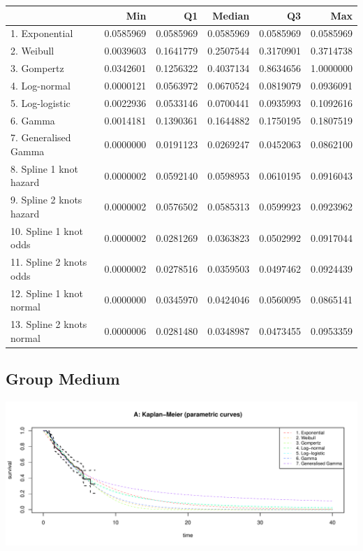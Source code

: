 \documentclass[]{article}
\begin{document}
\begin{tabular}{lrrrrr}
\toprule
  & Min & Q1 & Median & Q3 & Max\\
\midrule
\rowcolor{gray!6}  1. Exponential & 0.0585969 & 0.0585969 & 0.0585969 & 0.0585969 & 0.0585969\\
2. Weibull & 0.0039603 & 0.1641779 & 0.2507544 & 0.3170901 & 0.3714738\\
\rowcolor{gray!6}  3. Gompertz & 0.0342601 & 0.1256322 & 0.4037134 & 0.8634656 & 1.0000000\\
4. Log-normal & 0.0000121 & 0.0563972 & 0.0670524 & 0.0819079 & 0.0936091\\
\rowcolor{gray!6}  5. Log-logistic & 0.0022936 & 0.0533146 & 0.0700441 & 0.0935993 & 0.1092616\\
6. Gamma & 0.0014181 & 0.1390361 & 0.1644882 & 0.1750195 & 0.1807519\\
\rowcolor{gray!6}  7. Generalised Gamma & 0.0000000 & 0.0191123 & 0.0269247 & 0.0452063 & 0.0862100\\
8. Spline 1 knot hazard & 0.0000002 & 0.0592140 & 0.0598953 & 0.0610195 & 0.0916043\\
\rowcolor{gray!6}  9. Spline 2 knots hazard & 0.0000002 & 0.0576502 & 0.0585313 & 0.0599923 & 0.0923962\\
10. Spline 1 knot odds & 0.0000002 & 0.0281269 & 0.0363823 & 0.0502992 & 0.0917044\\
\rowcolor{gray!6}  11. Spline 2 knots odds & 0.0000002 & 0.0278516 & 0.0359503 & 0.0497462 & 0.0924439\\
12. Spline 1 knot normal & 0.0000000 & 0.0345970 & 0.0424046 & 0.0560095 & 0.0865141\\
\rowcolor{gray!6}  13. Spline 2 knots normal & 0.0000006 & 0.0281480 & 0.0348987 & 0.0473455 & 0.0953359\\
\bottomrule
\end{tabular}

\newpage

\subsection{Group Medium}\label{group-medium}

\begin{flushleft}\includegraphics[height=0.29\textheight]{images/validate_extrapolation2-1} \end{flushleft}
\end{document}
